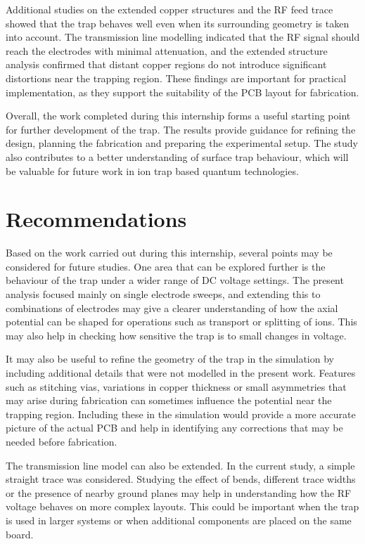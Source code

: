 \documentclass[12pt,a4paper]{report}
\begin{document}
Additional studies on the extended copper structures and the RF feed trace showed that the trap behaves well even when its surrounding geometry is taken into account. The transmission line modelling indicated that the RF signal should reach the electrodes with minimal attenuation, and the extended structure analysis confirmed that distant copper regions do not introduce significant distortions near the trapping region. These findings are important for practical implementation, as they support the suitability of the PCB layout for fabrication.

Overall, the work completed during this internship forms a useful starting point for further development of the trap. The results provide guidance for refining the design, planning the fabrication and preparing the experimental setup. The study also contributes to a better understanding of surface trap behaviour, which will be valuable for future work in ion trap based quantum technologies.

\chapter*{Recommendations}

Based on the work carried out during this internship, several points may be considered for future studies. One area that can be explored further is the behaviour of the trap under a wider range of DC voltage settings. The present analysis focused mainly on single electrode sweeps, and extending this to combinations of electrodes may give a clearer understanding of how the axial potential can be shaped for operations such as transport or splitting of ions. This may also help in checking how sensitive the trap is to small changes in voltage.

It may also be useful to refine the geometry of the trap in the simulation by including additional details that were not modelled in the present work. Features such as stitching vias, variations in copper thickness or small asymmetries that may arise during fabrication can sometimes influence the potential near the trapping region. Including these in the simulation would provide a more accurate picture of the actual PCB and help in identifying any corrections that may be needed before fabrication.

The transmission line model can also be extended. In the current study, a simple straight trace was considered. Studying the effect of bends, different trace widths or the presence of nearby ground planes may help in understanding how the RF voltage behaves on more complex layouts. This could be important when the trap is used in larger systems or when additional components are placed on the same board.
\end{document}
